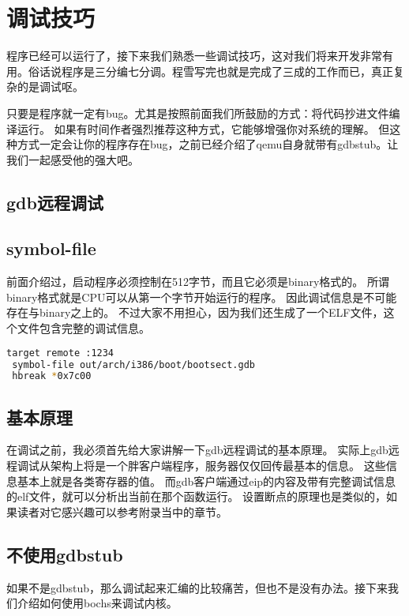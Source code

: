 \section{调试技巧}

程序已经可以运行了，接下来我们熟悉一些调试技巧，这对我们将来开发非常有用。俗话说程序是三分编七分调。程雪写完也就是完成了三成的工作而已，真正复杂的是调试呕。

只要是程序就一定有bug。尤其是按照前面我们所鼓励的方式：将代码抄进文件编译运行。
如果有时间作者强烈推荐这种方式，它能够增强你对系统的理解。
但这种方式一定会让你的程序存在bug，之前已经介绍了qemu自身就带有gdbstub。让我们一起感受他的强大吧。
\subsection{gdb远程调试}
\subsection{symbol-file}
前面介绍过，启动程序必须控制在512字节，而且它必须是binary格式的。
所谓binary格式就是CPU可以从第一个字节开始运行的程序。
因此调试信息是不可能存在与binary之上的。
不过大家不用担心，因为我们还生成了一个ELF文件，这个文件包含完整的调试信息。
\begin{lstlisting}[language=bash]
 target remote :1234
 symbol-file out/arch/i386/boot/bootsect.gdb
 hbreak *0x7c00
\end{lstlisting}
\subsection{基本原理}
在调试之前，我必须首先给大家讲解一下gdb远程调试的基本原理。
实际上gdb远程调试从架构上将是一个胖客户端程序，服务器仅仅回传最基本的信息。
这些信息基本上就是各类寄存器的值。
而gdb客户端通过eip的内容及带有完整调试信息的elf文件，就可以分析出当前在那个函数运行。
设置断点的原理也是类似的，如果读者对它感兴趣可以参考附录当中的章节。

\subsection{不使用gdbstub}
如果不是gdbstub，那么调试起来汇编的比较痛苦，但也不是没有办法。接下来我们介绍如何使用bochs来调试内核。
